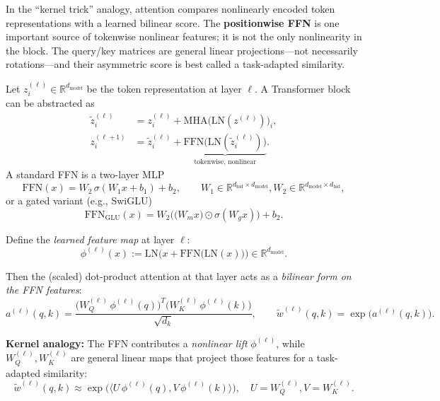 \documentclass{article}
\begin{document}
\begin{tcolorbox}[colback=blue!5!white, colframe=blue!75!black, title=A Kernel Analogy: The Role of the FFN]

In the ``kernel trick'' analogy, attention compares nonlinearly encoded token
representations with a learned bilinear score. The \textbf{positionwise FFN} is one
important source of tokenwise nonlinear features; it is not the only nonlinearity in
the block. The query/key matrices are general linear projections---not necessarily
rotations---and their asymmetric score is best called a task-adapted similarity.

Let $z_i^{(\ell)}\in\mathbb{R}^{d_{\mathrm{model}}}$ be the token representation at layer $\ell$.
A Transformer block can be abstracted as
\begin{align}
\tilde{z}_i^{(\ell)} &= z_i^{(\ell)} + \mathrm{MHA}\big(\mathrm{LN}(z^{(\ell)})\big)_i, \\
z_i^{(\ell+1)} &= \tilde{z}_i^{(\ell)} + \underbrace{\mathrm{FFN}\big(\mathrm{LN}(\tilde{z}_i^{(\ell)})\big)}_{\text{tokenwise, nonlinear}}.
\end{align}
A standard FFN is a two-layer MLP
\begin{equation}
\mathrm{FFN}(x) = W_2\,\sigma(W_1 x + b_1) + b_2,
\qquad
W_1\in\mathbb{R}^{d_{\mathrm{hid}}\times d_{\mathrm{model}}}, W_2\in\mathbb{R}^{d_{\mathrm{model}}\times d_{\mathrm{hid}}},
\end{equation}
or a gated variant (e.g., SwiGLU)
\begin{equation}
\mathrm{FFN}_{\mathrm{GLU}}(x) = W_2\Big(\big(W_m x\big)\odot \sigma(W_g x)\Big) + b_2.
\end{equation}

Define the \emph{learned feature map} at layer $\ell$:
\begin{equation}
\phi^{(\ell)}(x):=\mathrm{LN}\Big(x + \mathrm{FFN}\big(\mathrm{LN}(x)\big)\Big)
\in\mathbb{R}^{d_{\mathrm{model}}}.
\end{equation}

Then the (scaled) dot-product attention at that layer acts as a \emph{bilinear form on the FFN features}:
\begin{equation}
a^{(\ell)}(q,k)
=
\frac{\big(W_Q^{(\ell)}\,\phi^{(\ell)}(q)\big)^T \big(W_K^{(\ell)}\,\phi^{(\ell)}(k)\big)}{\sqrt{d_k}},
\qquad
\tilde{w}^{(\ell)}(q,k)=\exp\big(a^{(\ell)}(q,k)\big).
\end{equation}

\textbf{Kernel analogy:}
The FFN contributes a \emph{nonlinear lift} $\phi^{(\ell)}$, while
$W_Q^{(\ell)}, W_K^{(\ell)}$ are general linear maps that project those features for a
task-adapted similarity:
\begin{equation}
\tilde{w}^{(\ell)}(q,k)
\approx
\exp\Big(\langle U\,\phi^{(\ell)}(q), V\,\phi^{(\ell)}(k)\rangle\Big),
\quad
U=W_Q^{(\ell)}, V=W_K^{(\ell)}.
\end{equation}


\end{tcolorbox}
\end{document}

